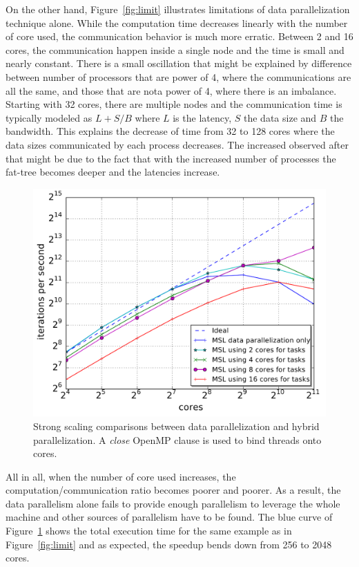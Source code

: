 On the other hand, Figure~\ref{fig:limit} illustrates limitations of data parallelization technique alone.
While the computation time decreases linearly with the number of core used, the communication behavior is much more erratic.
Between 2 and 16 cores, the communication happen inside a single node and the time is small and nearly constant.
There is a small oscillation that might be explained by difference between number of processors that are power of 4, where the communications are all the same, and those that are nota power of 4, where there is an imbalance.
Starting with 32 cores, there are multiple nodes and the communication time is typically modeled as $L+S/B$ where $L$ is the latency, $S$ the data size and $B$ the bandwidth.
This explains the decrease of time from 32 to 128 cores where the data sizes communicated by each process decreases.
The increased observed after that might be due to the fact that with the increased number of processes the fat-tree becomes deeper and the latencies increase.

\begin{figure}[th]\begin{center}
  \includegraphics[width=.6\textwidth]{../IJPP/results/task_scaling/500_200/base_close_median.pdf}
  \caption{Strong scaling comparisons between data parallelization and hybrid parallelization. A \emph{close} OpenMP clause is used to bind threads onto cores.}
  \label{fig:close}
\end{center}\end{figure}

All in all, when the number of core used increases, the computation/communication ratio becomes poorer and poorer.
As a result, the data parallelism alone fails to provide enough parallelism to leverage the whole machine and other sources of parallelism have to be found.
The blue curve of Figure~\ref{fig:close} shows the total execution time for the same example as in Figure~\ref{fig:limit} and as expected, the speedup bends down from 256 to 2048 cores.

